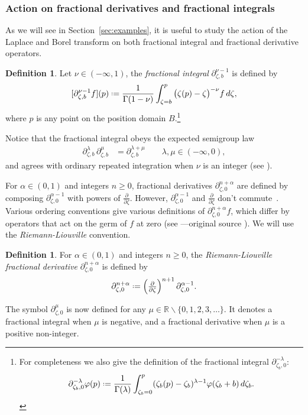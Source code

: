 \documentclass{article}
\newcommand{\R}{\mathbb{R}}
\newcommand{\fracderiv}[3]{\partial^{#1}_{#2, #3}}
\newcommand*{\defeq}{\mathrel{\vcenter{\baselineskip0.5ex \lineskiplimit0pt
                     \hbox{\scriptsize.}\hbox{\scriptsize.}}}%
                     =}
\theoremstyle{definition}
\newtheorem{defn}{Definition}
\newtheorem{definition}{Definition}[section]
\theoremstyle{plain}
\begin{document}
\subsubsection{Action on fractional derivatives and fractional integrals}\label{sec:frac-diff-laplace}
As we will see in Section~\ref{sec:examples}, it is useful to study the action of the Laplace and Borel transform on both fractional integral and fractional derivative operators.
\begin{defn}
    Let $\nu \in (-\infty, 1)$, the \textit{fractional integral} $\partial^{\nu-1}_{\zeta, b}$ is defined by
\[ [\partial^{\nu-1}_{\zeta, b} f](p) \defeq \frac{1}{\Gamma(1-\nu)} \int_{\zeta =b}^p \big(\zeta(p)-\zeta\big)^{-\nu} f\,d\zeta, \]
where $p$ is any point on the position domain $B$.\footnote{For completeness we also give the definition of the fractional integral $\partial_{\zeta_b,0}^{-\lambda}$: 
%
\begin{equation*}
    \partial_{\zeta_b,0}^{-\lambda}\varphi(p)\defeq\frac{1}{\Gamma(\lambda)}\int_{\zeta_b=0}^{p}(\zeta_b(p)-\zeta_b)^{\lambda-1} \varphi(\zeta_b+b)\, d\zeta_b.
\end{equation*}} 
\end{defn}
Notice that the fractional integral obeys the expected semigroup law \cite[Section  1.3]{mladenov2014advanced}
\begin{align*}
\fracderiv{\lambda}{\zeta}{b}\,\fracderiv{\mu}{\zeta}{b} & = \fracderiv{\lambda+\mu}{\zeta}{b} \qquad \lambda, \mu \in (-\infty, 0),
\end{align*}
and agrees with ordinary repeated integration when $\nu$ is an integer (see \cite[Equation 35]{mladenov2014advanced}).

For $\alpha \in (0, 1)$ and integers $n \ge 0$, fractional derivatives $\fracderiv{n+\alpha}{\zeta}{0}$ are defined by composing $\fracderiv{\alpha-1}{\zeta}{0}$ with powers of $\tfrac{\partial}{\partial \zeta}$. However, $\fracderiv{\alpha-1}{\zeta}{0}$ and $\tfrac{\partial}{\partial \zeta}$ don't commute~\cite[equation 54]{mladenov2014advanced}. Various ordering conventions give various definitions of $\fracderiv{n+\alpha}{\zeta}{0} f$, which differ by operators that act on the germ of $f$ at zero (see \cite[Section 1.3]{mladenov2014advanced}---original source \cite{podlubny}). We will use the {\em Riemann-Liouville} convention.
\begin{definition}\label{defn:frac_driv}
For $\alpha \in (0, 1)$ and integers $n \ge 0$, the {\em Riemann-Liouville fractional derivative} $\fracderiv{n+\alpha}{\zeta}{0}$ is defined by
\[ \fracderiv{n+\alpha}{\zeta}{0} \defeq \left(\tfrac{\partial}{\partial \zeta}\right)^{n+1} \fracderiv{\alpha-1}{\zeta}{0}. \]
\end{definition}
The symbol $\fracderiv{\mu}{\zeta}{0}$ is now defined for any $\mu \in \R \smallsetminus \{0, 1, 2, 3, \ldots\}$. It denotes a fractional integral when $\mu$ is negative, and a fractional derivative when $\mu$ is a positive non-integer.
\end{document}
